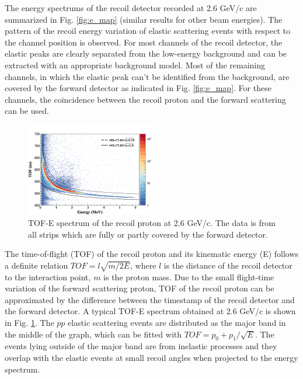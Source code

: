 \documentclass[number,5p]{elsarticle}
\begin{document}
The energy spectrums of the recoil detector recorded at 2.6 GeV/c are
summarized in Fig. \ref{fig:e_map} (similar results for other beam energies). 
The pattern of the recoil energy variation of elastic scattering events with respect to the channel position is observed.
For most channels of the recoil detector, the elastic peaks are clearly
separated from the low-energy background
and can be extracted with an appropriate background model.
Most of the remaining channels, in which the elastic peak can't be identified from the
background, are covered by the forward detector as indicated in Fig. \ref{fig:e_map}.
For these channels, the coincidence between the recoil proton and the forward
scattering can be used.

\begin{figure}[htbp]
  \centering
  \includegraphics[width=0.5\textwidth]{./tof_e_cut.png}
  \caption{
    TOF-E spectrum of the recoil proton at 2.6 GeV/c. The data is from all strips which are fully or partly covered by the forward detector.}
  \label{fig:tof-e}
\end{figure}

The time-of-flight (TOF) of the recoil proton and its kinematic energy (E)
follows a definite relation $TOF = l\sqrt{m/2E}$, where $l$ is the distance of
the recoil detector to the interaction point, $m$ is the proton mass.
Due to the small flight-time variation of the forward scattering proton, TOF of the recoil proton can be approximated by the difference
between the timestamp of the recoil detector and the forward detector.
A typical TOF-E spectrum obtained at 2.6 GeV/c is shown in Fig. \ref{fig:tof-e}. 
The $pp$ elastic scattering events are distributed as the major band in the
middle of the graph, which can be fitted with \(TOF = p_{0} + p_{1}/{\sqrt{E}}\).
The events lying outside of the major band are from inelastic processes and
they overlap with the elastic events at small recoil angles when projected to the energy spectrum.
\end{document}
